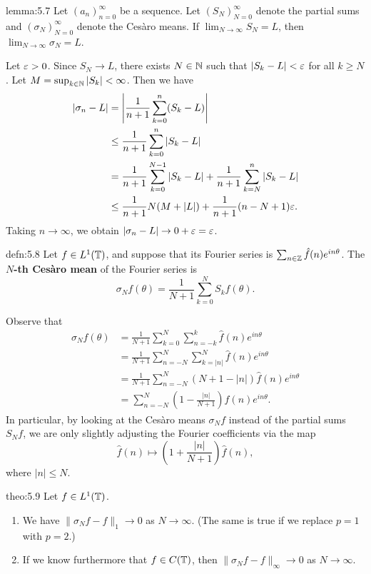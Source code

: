 \begin{lemma}{lemma:5.7}
    Let $(a_n)_{n=0}^\infty$ be a sequence. Let $(S_N)_{N=0}^\infty$ denote the 
    partial sums and $(\sigma_N)_{N=0}^\infty$ denote the Ces\`aro means. 
    If $\lim_{N\to\infty} S_N = L$, then $\lim_{N\to\infty} \sigma_N = L$. 
\end{lemma}
\begin{pf}
    Let $\varepsilon > 0$. Since $S_N \to L$, there exists $N \in \mathbb{N}$ such that 
    $|S_k - L| < \varepsilon$ for all $k \geq N$. Let $M = \sup_{k\in\mathbb{N}} |S_k| < \infty$. 
    Then we have 
    \begin{align*}
        |\sigma_n - L| &= \left| \frac{1}{n+1} \sum_{k=0}^n (S_k - L) \right| \\
        &\leq \frac{1}{n+1} \sum_{k=0}^n |S_k - L| \\ 
        &= \frac{1}{n+1} \sum_{k=0}^{N-1} |S_k - L| + \frac{1}{n+1} \sum_{k=N}^n |S_k - L| \\ 
        &\leq \frac{1}{n+1} N(M + |L|) + \frac{1}{n+1} (n - N + 1)\varepsilon . 
    \end{align*}
    Taking $n \to \infty$, we obtain $|\sigma_n - L| \to 0 + \varepsilon = \varepsilon$. 
\end{pf}

\begin{defn}{defn:5.8}
    Let $f \in L^1(\mathbb{T})$, and suppose that its Fourier series is $\sum_{n\in\mathbb{Z}}
    \hat f(n) e^{in\theta}$. The {\bf $N$-th Ces\`aro mean} of the Fourier 
    series is 
    \[ \sigma_N f(\theta) = \frac{1}{N+1} \sum_{k=0}^N S_k f(\theta). \] 
\end{defn}

Observe that 
\begin{align*}
    \sigma_N f(\theta) 
    &= \frac{1}{N+1} \sum_{k=0}^N \sum_{n=-k}^k \hat f(n) e^{in\theta} \\ 
    &= \frac{1}{N+1} \sum_{n=-N}^N \sum_{k=|n|}^N \hat f(n) e^{in\theta} \\ 
    &= \frac{1}{N+1} \sum_{n=-N}^N (N + 1 - |n|) \hat f(n) e^{in\theta} \\ 
    &= \sum_{n=-N}^N \left( 1 - \frac{|n|}{N+1} \right) \hat f(n) e^{in\theta}. 
\end{align*}
In particular, by looking at the Ces\`aro means $\sigma_N f$ instead of 
the partial sums $S_N f$, we are only slightly adjusting the Fourier 
coefficients via the map 
\[ \hat f(n) \mapsto \left( 1 + \frac{|n|}{N+1} \right) \hat f(n), \] 
where $|n| \leq N$. 

\begin{theo}{theo:5.9}
    Let $f \in L^1(\mathbb{T})$. 
    \begin{enumerate}[(1)]
        \item We have $\|\sigma_N f - f\|_1 \to 0$ as $N \to \infty$. (The same 
        is true if we replace $p = 1$ with $p = 2$.)
        \item If we know furthermore that $f \in C(\mathbb{T})$, then $\|\sigma_N f - f\|_\infty
        \to 0$ as $N \to \infty$. 
    \end{enumerate}
\end{theo}

